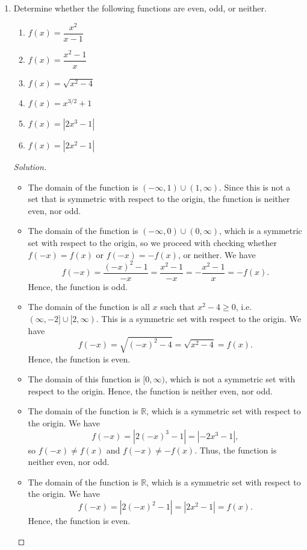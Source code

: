 \documentclass[12pt]{article}
\newenvironment{solution}{\begin{proof}[Solution]}{\end{proof}}
\begin{document}
\begin{enumerate}
\begin{solution}
\begin{itemize}
			\end{itemize}
		\end{solution}
		\item Determine whether the following functions are even, odd, or neither.
		\begin{enumerate}
			\item $f(x)=\dfrac{x^2}{x-1}$
			\item $f(x)=\dfrac{x^2-1}{x}$
			\item $f(x)=\sqrt{x^2-4}$
			\item $f(x)=x^{3/2}+1$
			\item $f(x)=|2x^3-1|$
			\item $f(x)=|2x^2-1|$
		\end{enumerate}
		\begin{solution}
			\begin{itemize}
				\item[(a)] The domain of the function is $(-\infty,1)\cup(1,\infty)$. Since this is not a set that is symmetric with respect to the origin, the function is neither even, nor odd.
				\item[(b)] The domain of the function is $(-\infty,0)\cup(0,\infty)$, which is a symmetric set with respect to the origin, so we proceed with checking whether $f(-x)=f(x)$ or $f(-x)=-f(x)$, or neither. We have $$f(-x)=\dfrac{(-x)^2-1}{-x}=\dfrac{x^2-1}{-x}=-\dfrac{x^2-1}{x}=-f(x).$$ Hence, the function is odd.
				\item[(c)] The domain of the function is all $x$ such that $x^2-4\geq0$, i.e. $(\infty,-2]\cup [2,\infty)$. This is a symmetric set with respect to the origin. We have $$f(-x)=\sqrt{(-x)^2-4}=\sqrt{x^2-4}=f(x).$$
				Hence, the function is even.
				\item[(d)] The domain of this function is $[0,\infty)$, which is not a symmetric set with respect to the origin. Hence, the function is neither even, nor odd.
				\item[(e)] The domain of the function is $\mathbb{R}$, which is a symmetric set with respect to the origin. We have $$f(-x)=|2(-x)^3-1|=|-2x^3-1|,$$
				so $f(-x)\neq f(x)$ and $f(-x)\neq -f(x)$. Thus, the function is neither even, nor odd.
				\item[(f)] The domain of the function is $\mathbb{R}$, which is a symmetric set with respect to the origin. We have
				$$f(-x)=|2(-x)^2-1|=|2x^2-1|=f(x).$$
				Hence, the function is even.
			\end{itemize}
		\end{solution}
		

\end{enumerate}
\end{document}
